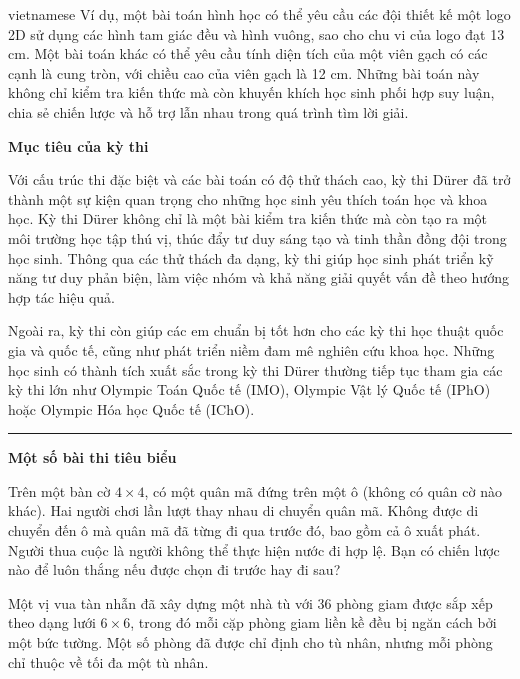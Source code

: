 \documentclass{article}
\begin{document}
\begin{otherlanguage*}{vietnamese}
Ví dụ, một bài toán hình học có thể yêu cầu các đội thiết kế một logo 2D sử dụng các hình tam giác đều và hình vuông, sao cho chu vi của logo đạt 13 cm.
Một bài toán khác có thể yêu cầu tính diện tích của một viên gạch có các cạnh là cung tròn, với chiều cao của viên gạch là 12 cm.
Những bài toán này không chỉ kiểm tra kiến thức mà còn khuyến khích học sinh phối hợp suy luận, chia sẻ chiến lược và hỗ trợ lẫn nhau trong quá trình tìm lời giải.

\textbf{Mục tiêu của kỳ thi}

Với cấu trúc thi đặc biệt và các bài toán có độ thử thách cao, kỳ thi Dürer đã trở thành một sự kiện quan trọng cho những học sinh yêu thích toán học và khoa học.
Kỳ thi Dürer không chỉ là một bài kiểm tra kiến thức mà còn tạo ra một môi trường học tập thú vị, thúc đẩy tư duy sáng tạo và tinh thần đồng đội trong học sinh.
Thông qua các thử thách đa dạng, kỳ thi giúp học sinh phát triển kỹ năng tư duy phản biện, làm việc nhóm và khả năng giải quyết vấn đề theo hướng hợp tác hiệu quả.

Ngoài ra, kỳ thi còn giúp các em chuẩn bị tốt hơn cho các kỳ thi học thuật quốc gia và quốc tế, cũng như phát triển niềm đam mê nghiên cứu khoa học.
Những học sinh có thành tích xuất sắc trong kỳ thi Dürer thường tiếp tục tham gia các kỳ thi lớn như Olympic Toán Quốc tế (IMO),
Olympic Vật lý Quốc tế (IPhO) hoặc Olympic Hóa học Quốc tế (IChO).

\bigbreak

\noindent\rule{16.5cm}{0.4pt}

\textbf{Một số bài thi tiêu biểu}

\bigbreak

\begin{problem*}
    Trên một bàn cờ $4 \times 4$, có một quân mã đứng trên một ô (không có quân cờ nào khác). Hai người chơi lần lượt thay nhau di chuyển quân mã.
    Không được di chuyển đến ô mà quân mã đã từng đi qua trước đó, bao gồm cả ô xuất phát. Người thua cuộc là người không thể thực hiện nước đi hợp lệ.
    Bạn có chiến lược nào để luôn thắng nếu được chọn đi trước hay đi sau?
\end{problem*}

\begin{problem*}
    Một vị vua tàn nhẫn đã xây dựng một nhà tù với 36 phòng giam được sắp xếp theo dạng lưới $6 \times 6$, trong đó mỗi cặp phòng giam liền kề đều bị ngăn cách bởi một bức tường.
    Một số phòng đã được chỉ định cho tù nhân, nhưng mỗi phòng chỉ thuộc về tối đa một tù nhân.


\end{problem*}
\end{otherlanguage*}
\end{document}
